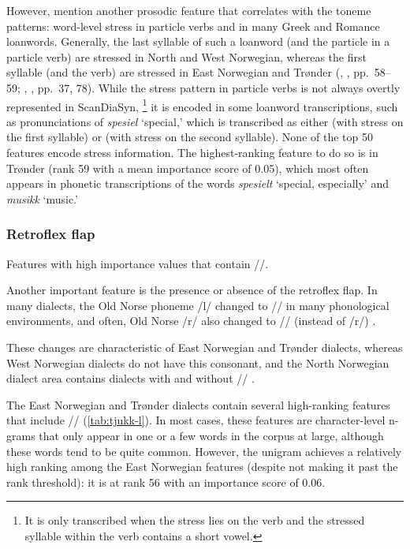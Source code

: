 However, \citet[pp.~36--37]{maehlum2012dialektlandskapet} mention another prosodic feature that correlates with the toneme patterns: word-level stress in particle verbs and in many Greek and Romance loanwords.
Generally, the last syllable of such a loanword (and the particle in a particle verb) are stressed in North and West Norwegian, whereas the first syllable (and the verb) are stressed in East Norwegian and Trønder (\citeauthor{hanssen2010dialekter}, \citeyear{hanssen2010dialekter}, pp.~58--59; \citeauthor{maehlum2012dialektlandskapet}, \citeyear{maehlum2012dialektlandskapet}, pp.~37, 78).
While the stress pattern in particle verbs is not always overtly represented in ScanDiaSyn,%
\footnote{It is only transcribed when the stress lies on the verb and the stressed syllable within the verb contains a short vowel.}
it is encoded in some loanword transcriptions, such as pronunciations of \textit{spesiel} `special,' which is transcribed as either  (with stress on the first syllable) or  (with stress on the second syllable).
None of the top 50 features encode stress information.
The highest-ranking feature to do so is  in Trønder (rank 59 with a mean importance score of 0.05), which most often appears in phonetic transcriptions of the words \textit{spesielt} `special, especially' and \textit{musikk} `music.'

\subsubsection{Retroflex flap}
\label{sec:dialects-features-tjukkl}

\begin{table}[htbp]
    
    \caption{Features with high importance values that contain /{\textrtailr}/.}
    \label{tab:tjukk-l}
\end{table}

Another important feature is the presence or absence of the retroflex flap.
In many dialects, the Old Norse phoneme /l/ changed to /{\textrtailr}/ in many phonological environments, and often, Old Norse /r{\dh}/ also changed to /{\textrtailr}/ (instead of /r/) \cite[p.~185]{sandoey1991dialektkunnskap}.


These changes are characteristic of East Norwegian and Tr{\o}nder dialects, whereas West Norwegian dialects do not have this consonant, and the North Norwegian dialect area contains dialects with and without /{\textrtailr}/ \cite[pp.~36, 184]{maehlum2012dialektlandskapet}.

The East Norwegian and Trønder dialects contain several high-ranking features that include /{\textrtailr}/ (\autoref{tab:tjukk-l}).
In most cases, these features are character-level n-grams that only appear in one or a few words in the corpus at large, although these words tend to be quite common.
However, the unigram \ngram{\textrtailr} achieves a relatively high ranking among the East Norwegian features (despite not making it past the rank threshold): it is at rank 56 with an importance score of 0.06.
